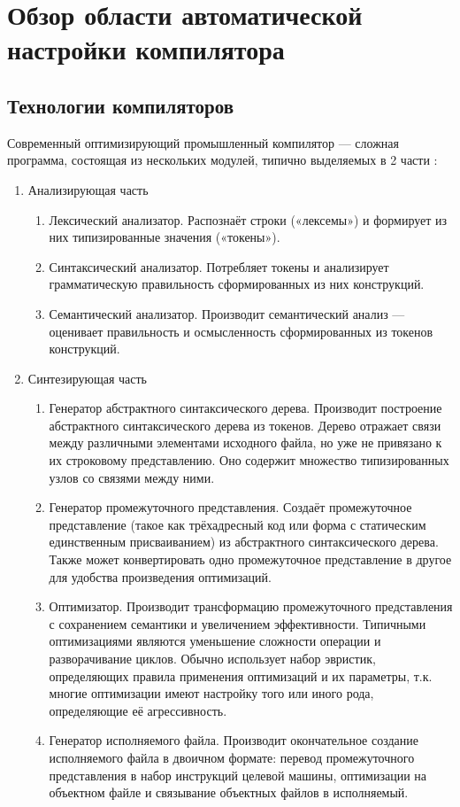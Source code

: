 \section{Обзор области автоматической настройки компилятора}
\subsection{Технологии компиляторов}
Современный оптимизирующий промышленный компилятор --- сложная программа, состоящая из нескольких модулей, типично выделяемых в 2 части \cite{Aho:2006:CPT:1177220}:
\begin{enumerate}
	\item Анализирующая часть
	\begin{enumerate}
		\item Лексический анализатор. Распознаёт строки («лексемы») и формирует из них типизированные значения («токены»).
		\item Синтаксический анализатор. Потребляет токены и анализирует грамматическую правильность сформированных из них конструкций.
		\item Семантический анализатор. Производит семантический анализ --- оценивает правильность и осмысленность сформированных из токенов конструкций.
	\end{enumerate}
	\item Синтезирующая часть
	\begin{enumerate}
		\item Генератор абстрактного синтаксического дерева. Производит построение абстрактного синтаксического дерева из токенов. Дерево отражает связи между различными элементами исходного файла, но уже не привязано к их строковому представлению. Оно содержит множество типизированных узлов со связями между ними.
		\item Генератор промежуточного представления. Создаёт промежуточное представление (такое как трёхадресный код или форма с статическим единственным присваиванием) из абстрактного синтаксического дерева. Также может конвертировать одно промежуточное представление в другое для удобства произведения оптимизаций.
		\item Оптимизатор. Производит трансформацию промежуточного представления с сохранением семантики и увеличением эффективности. Типичными оптимизациями являются уменьшение сложности операции и разворачивание циклов. Обычно использует набор эвристик, определяющих правила применения оптимизаций и их параметры, т.к. многие оптимизации имеют настройку того или иного рода, определяющие её агрессивность.
		\item Генератор исполняемого файла. Производит окончательное создание исполняемого файла в двоичном формате: перевод промежуточного представления в набор инструкций целевой машины, оптимизации на объектном файле и связывание объектных файлов в исполняемый.
	\end{enumerate}
\end{enumerate}

